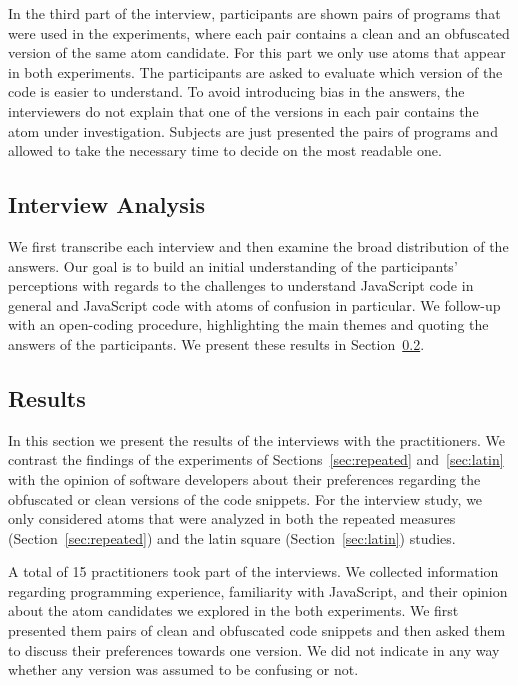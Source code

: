 In the third part of the interview, participants are shown pairs of programs that were used in the experiments, where each pair contains a clean and an obfuscated version of the same atom candidate. For this part we only use atoms that appear in both experiments. The participants 
are asked to evaluate which version of the code is easier to understand. To avoid introducing bias in the answers, the interviewers do not explain that one of the versions in each pair contains the atom under investigation. Subjects are just presented the pairs of programs and allowed to take the necessary time to decide on the most readable one.

\subsection{Interview Analysis}

We first transcribe each interview and then examine the broad distribution of the answers. Our goal is to build an initial understanding of the participants' perceptions with regards to the challenges to understand JavaScript code in general and JavaScript code with atoms of confusion in particular. We follow-up with an open-coding procedure, highlighting the main themes and quoting the answers of the participants. We present these results in Section~\ref{sec:interview-results}. 


\subsection{Results}\label{sec:interview-results}

In this section we present the results of the interviews with the practitioners. We contrast the findings of the experiments of Sections~\ref{sec:repeated} and~\ref{sec:latin} with the opinion of software developers about their preferences regarding the obfuscated or clean versions of the code snippets. For the interview study, we only considered atoms that were analyzed in both the repeated measures (Section~\ref{sec:repeated}) and the latin square (Section~\ref{sec:latin}) studies. 

A total of 15 practitioners took part of the interviews.
We collected information regarding programming
experience, familiarity with JavaScript, and their opinion about the \na atom candidates we explored in the both experiments. We first presented them pairs of clean and obfuscated code snippets and then asked them to discuss their preferences towards one version. We did not indicate in any way whether any version was assumed to be confusing or not. 

